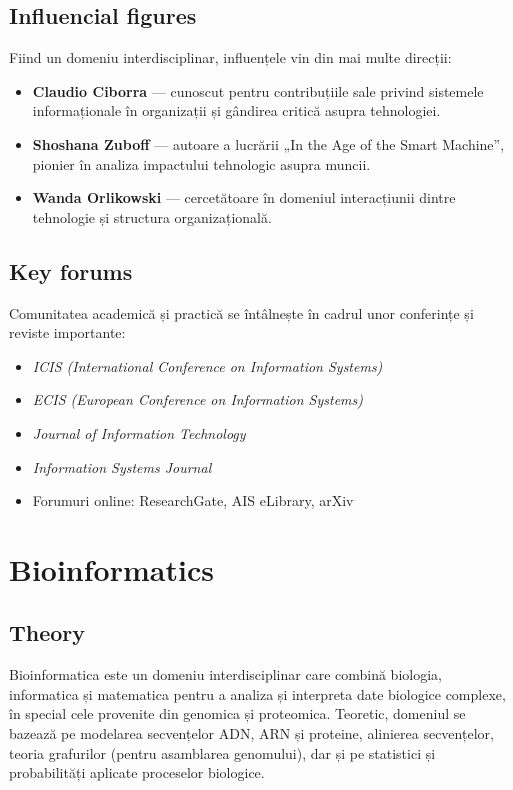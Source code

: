 \documentclass[12pt, letterpaper]{article}
\begin{document}
\subsection*{Influencial figures}
Fiind un domeniu interdisciplinar, influențele vin din mai multe direcții:
\begin{itemize}
    \item \textbf{Claudio Ciborra} — cunoscut pentru contribuțiile sale privind sistemele informaționale în organizații și gândirea critică asupra tehnologiei.
    \item \textbf{Shoshana Zuboff} — autoare a lucrării „In the Age of the Smart Machine”, pionier în analiza impactului tehnologic asupra muncii.
    \item \textbf{Wanda Orlikowski} — cercetătoare în domeniul interacțiunii dintre tehnologie și structura organizațională.
\end{itemize}

\subsection*{Key forums}
Comunitatea academică și practică se întâlnește în cadrul unor conferințe și reviste importante:
\begin{itemize}
    \item \textit{ICIS (International Conference on Information Systems)}
    \item \textit{ECIS (European Conference on Information Systems)}
    \item \textit{Journal of Information Technology}
    \item \textit{Information Systems Journal}
    \item Forumuri online: ResearchGate, AIS eLibrary, arXiv
\end{itemize}


\newpage

\section{Bioinformatics}

\subsection*{Theory}
Bioinformatica este un domeniu interdisciplinar care combină biologia, informatica și matematica pentru a analiza și interpreta date biologice complexe, în special cele provenite din genomica și proteomica. Teoretic, domeniul se bazează pe modelarea secvențelor ADN, ARN și proteine, alinierea secvențelor, teoria grafurilor (pentru asamblarea genomului), dar și pe statistici și probabilități aplicate proceselor biologice.
\end{document}
